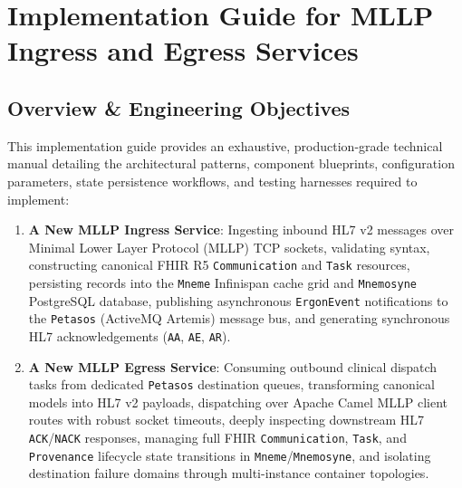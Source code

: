 
\chapter{Implementation Guide for MLLP Ingress and Egress Services}
\label{app:mllp_services}

\section{Overview \& Engineering Objectives}
\label{sec:mllp_guide_overview}

This implementation guide provides an exhaustive, production-grade technical manual detailing the architectural patterns, component blueprints, configuration parameters, state persistence workflows, and testing harnesses required to implement:
\begin{enumerate}
    \item \textbf{A New MLLP Ingress Service}: Ingesting inbound HL7 v2 messages over Minimal Lower Layer Protocol (MLLP) TCP sockets, validating syntax, constructing canonical FHIR R5 \texttt{Communication} and \texttt{Task} resources, persisting records into the \texttt{Mneme} Infinispan cache grid and \texttt{Mnemosyne} PostgreSQL database, publishing asynchronous \texttt{ErgonEvent} notifications to the \texttt{Petasos} (ActiveMQ Artemis) message bus, and generating synchronous HL7 acknowledgements (\texttt{AA}, \texttt{AE}, \texttt{AR}).
    \item \textbf{A New MLLP Egress Service}: Consuming outbound clinical dispatch tasks from dedicated \texttt{Petasos} destination queues, transforming canonical models into HL7 v2 payloads, dispatching over Apache Camel MLLP client routes with robust socket timeouts, deeply inspecting downstream HL7 \texttt{ACK}/\texttt{NACK} responses, managing full FHIR \texttt{Communication}, \texttt{Task}, and \texttt{Provenance} lifecycle state transitions in \texttt{Mneme}/\texttt{Mnemosyne}, and isolating destination failure domains through multi-instance container topologies.
\end{enumerate}

